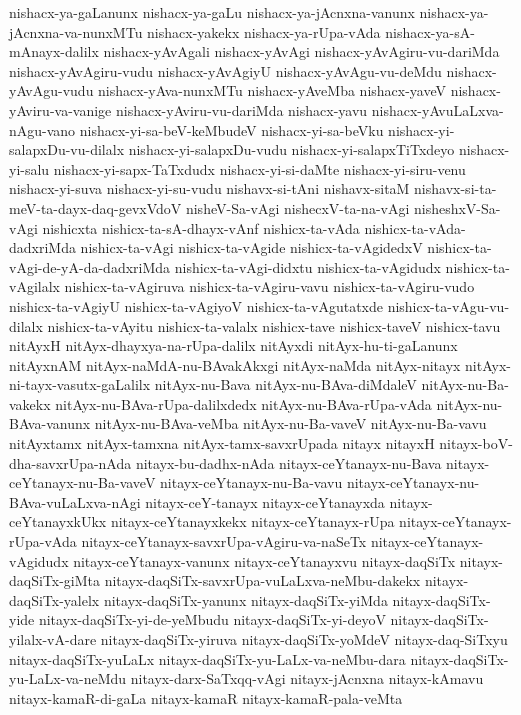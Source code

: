 {nishacx-ya-gaLanunx
nishacx-ya-gaLu
nishacx-ya-jAcnxna-vanunx
nishacx-ya-jAcnxna-va-nunxMTu
nishacx-yakekx
nishacx-ya-rUpa-vAda
nishacx-ya-sA-mAnayx-dalilx
nishacx-yAvAgali
nishacx-yAvAgi
nishacx-yAvAgiru-vu-dariMda
nishacx-yAvAgiru-vudu
nishacx-yAvAgiyU
nishacx-yAvAgu-vu-deMdu
nishacx-yAvAgu-vudu
nishacx-yAva-nunxMTu
nishacx-yAveMba
nishacx-yaveV
nishacx-yAviru-va-vanige
nishacx-yAviru-vu-dariMda
nishacx-yavu
nishacx-yAvuLaLxva-nAgu-vano
nishacx-yi-sa-beV-keMbudeV
nishacx-yi-sa-beVku
nishacx-yi-salapxDu-vu-dilalx
nishacx-yi-salapxDu-vudu
nishacx-yi-salapxTiTxdeyo
nishacx-yi-salu
nishacx-yi-sapx-TaTxdudx
nishacx-yi-si-daMte
nishacx-yi-siru-venu
nishacx-yi-suva
nishacx-yi-su-vudu
nishavx-si-tAni
nishavx-sitaM
nishavx-si-ta-meV-ta-dayx-daq-gevxVdoV
nisheV-Sa-vAgi
nishecxV-ta-na-vAgi
nisheshxV-Sa-vAgi
nishicxta
nishicx-ta-sA-dhayx-vAnf
nishicx-ta-vAda
nishicx-ta-vAda-dadxriMda
nishicx-ta-vAgi
nishicx-ta-vAgide
nishicx-ta-vAgidedxV
nishicx-ta-vAgi-de-yA-da-dadxriMda
nishicx-ta-vAgi-didxtu
nishicx-ta-vAgidudx
nishicx-ta-vAgilalx
nishicx-ta-vAgiruva
nishicx-ta-vAgiru-vavu
nishicx-ta-vAgiru-vudo
nishicx-ta-vAgiyU
nishicx-ta-vAgiyoV
nishicx-ta-vAgutatxde
nishicx-ta-vAgu-vu-dilalx
nishicx-ta-vAyitu
nishicx-ta-valalx
nishicx-tave
nishicx-taveV
nishicx-tavu
nitAyxH
nitAyx-dhayxya-na-rUpa-dalilx
nitAyxdi
nitAyx-hu-ti-gaLanunx
nitAyxnAM
nitAyx-naMdA-nu-BAvakAkxgi
nitAyx-naMda
nitAyx-nitayx
nitAyx-ni-tayx-vasutx-gaLalilx
nitAyx-nu-Bava
nitAyx-nu-BAva-diMdaleV
nitAyx-nu-Ba-vakekx
nitAyx-nu-BAva-rUpa-dalilxdedx
nitAyx-nu-BAva-rUpa-vAda
nitAyx-nu-BAva-vanunx
nitAyx-nu-BAva-veMba
nitAyx-nu-Ba-vaveV
nitAyx-nu-Ba-vavu
nitAyxtamx
nitAyx-tamxna
nitAyx-tamx-savxrUpada
nitayx
nitayxH
nitayx-boV-dha-savxrUpa-nAda
nitayx-bu-dadhx-nAda
nitayx-ceYtanayx-nu-Bava
nitayx-ceYtanayx-nu-Ba-vaveV
nitayx-ceYtanayx-nu-Ba-vavu
nitayx-ceYtanayx-nu-BAva-vuLaLxva-nAgi
nitayx-ceY-tanayx
nitayx-ceYtanayxda
nitayx-ceYtanayxkUkx
nitayx-ceYtanayxkekx
nitayx-ceYtanayx-rUpa
nitayx-ceYtanayx-rUpa-vAda
nitayx-ceYtanayx-savxrUpa-vAgiru-va-naSeTx
nitayx-ceYtanayx-vAgidudx
nitayx-ceYtanayx-vanunx
nitayx-ceYtanayxvu
nitayx-daqSiTx
nitayx-daqSiTx-giMta
nitayx-daqSiTx-savxrUpa-vuLaLxva-neMbu-dakekx
nitayx-daqSiTx-yalelx
nitayx-daqSiTx-yanunx
nitayx-daqSiTx-yiMda
nitayx-daqSiTx-yide
nitayx-daqSiTx-yi-de-yeMbudu
nitayx-daqSiTx-yi-deyoV
nitayx-daqSiTx-yilalx-vA-dare
nitayx-daqSiTx-yiruva
nitayx-daqSiTx-yoMdeV
nitayx-daq-SiTxyu
nitayx-daqSiTx-yuLaLx
nitayx-daqSiTx-yu-LaLx-va-neMbu-dara
nitayx-daqSiTx-yu-LaLx-va-neMdu
nitayx-darx-SaTxqq-vAgi
nitayx-jAcnxna
nitayx-kAmavu
nitayx-kamaR-di-gaLa
nitayx-kamaR
nitayx-kamaR-pala-veMta
}
